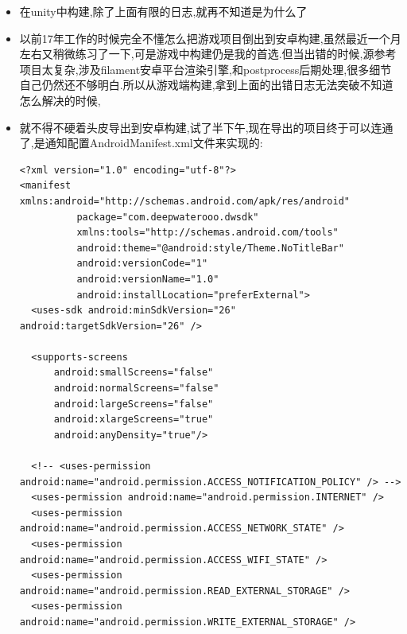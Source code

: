 \documentclass[9pt, b5paper]{article}
\begin{document}
\begin{itemize}
\item 在unity中构建,除了上面有限的日志,就再不知道是为什么了
\item 以前17年工作的时候完全不懂怎么把游戏项目倒出到安卓构建,虽然最近一个月左右又稍微练习了一下,可是游戏中构建仍是我的首选.但当出错的时候,源参考项目太复杂,涉及filament安卓平台渲染引擎,和postprocess后期处理,很多细节自己仍然还不够明白.所以从游戏端构建,拿到上面的出错日志无法突破不知道怎么解决的时候,
\item 就不得不硬着头皮导出到安卓构建,试了半下午,现在导出的项目终于可以连通了,是通知配置AndroidManifest.xml文件来实现的:
\begin{verbatim}
<?xml version="1.0" encoding="utf-8"?>
<manifest xmlns:android="http://schemas.android.com/apk/res/android"
          package="com.deepwaterooo.dwsdk"
          xmlns:tools="http://schemas.android.com/tools"
          android:theme="@android:style/Theme.NoTitleBar"
          android:versionCode="1"
          android:versionName="1.0"
          android:installLocation="preferExternal">
  <uses-sdk android:minSdkVersion="26" android:targetSdkVersion="26" />

  <supports-screens
      android:smallScreens="false"
      android:normalScreens="false"
      android:largeScreens="false"
      android:xlargeScreens="true"
      android:anyDensity="true"/>

  <!-- <uses-permission android:name="android.permission.ACCESS_NOTIFICATION_POLICY" /> -->
  <uses-permission android:name="android.permission.INTERNET" />
  <uses-permission android:name="android.permission.ACCESS_NETWORK_STATE" />
  <uses-permission android:name="android.permission.ACCESS_WIFI_STATE" />
  <uses-permission android:name="android.permission.READ_EXTERNAL_STORAGE" />
  <uses-permission android:name="android.permission.WRITE_EXTERNAL_STORAGE" />


\end{verbatim}
\end{itemize}
\end{document}
